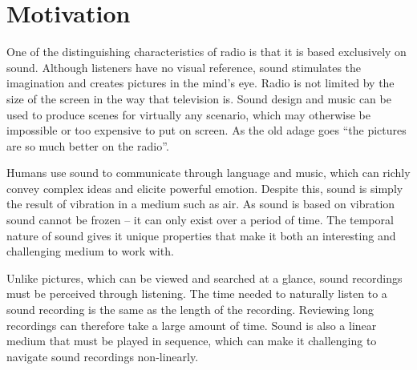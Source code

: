 
\section{Motivation}\label{sec:intro-motivation}



One of the distinguishing characteristics of radio is that it is based exclusively on sound.  Although listeners have
no visual reference, sound stimulates the imagination and creates pictures in the mind's eye.  Radio is not limited
by the size of the screen in the way that television is. Sound design and music can be used to produce scenes for
virtually any scenario, which may otherwise be impossible or too expensive to put on screen. As the old adage goes
``the pictures are so much better on the radio''.

Humans use sound to communicate through language and music, which can richly convey complex ideas and elicite powerful
emotion. Despite this, sound is simply the result of vibration in a medium such as air.  As sound is based on vibration
sound cannot be frozen -- it can only exist over a period of time. The temporal nature of sound gives it unique
properties that make it both an interesting and challenging medium to work with.

Unlike pictures, which can be viewed and searched at a glance, sound recordings must be perceived through listening.
The time needed to naturally listen to a sound recording is the same as the length of the recording.  Reviewing long
recordings can therefore take a large amount of time. Sound is also a linear medium that must be played in sequence,
which can make it challenging to navigate sound recordings non-linearly. 

